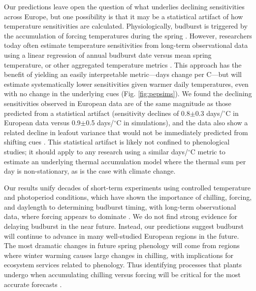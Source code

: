 \documentclass{article}
\newcommand{\R}[1]{\label{#1}\linelabel{#1}}
\begin{document}
\par Our predictions leave open the question of what underlies declining sensitivities across Europe, but one possibility is that it may be a statistical artifact of how temperature sensitivities are calculated. Physiologically, budburst is triggered by the accumulation of forcing temperatures during the spring \emph{\citep{chuine2016,hanninen1995}}. However, researchers today often estimate temperature sensitivities from long-term observational data using a linear regression of annual budburst date versus mean spring temperature, or other aggregated temperature metrics \emph{\citep[e.g.,][]{Wolkovich:2012n}}. This approach has the benefit of yielding an easily interpretable metric---days change per \degree C---but will estimate systematically lower sensitivities given warmer daily temperatures, even with no change in the underlying cues (Fig. \ref{fig:pepsims}). We found the declining sensitivities observed in European data are of the same magnitude as those predicted from a statistical artifact (sensitivity declines of 0.8$\pm$0.3 days/$^{\circ}$C in European data versus 0.9$\pm$0.5 days/$^{\circ}$C in simulations), and the data also show a related decline in leafout variance that would not be immediately predicted from shifting cues \emph{\citep[ \emph{Potential statistical artifacts in declines of temperature sensitivity in observational long-term data} ][]{gusewell2017}}. This statistical artifact is likely not confined to phenological studies; it should apply to any research using a similar days/$^{\circ}$C metric to estimate an underlying thermal accumulation model where the thermal sum per day is non-stationary, as is the case with climate change. 

 \par Our results unify decades of short-term experiments using controlled temperature and photoperiod conditions, which have shown the importance of chilling, forcing, and daylength to determining budburst timing, with long-term observational data, where forcing appears to dominate \R{addedroberts} \emph{\citep[e.g.,][]{roberts2015}}. We do not find strong evidence for delaying budburst in the near future. Instead, our predictions suggest budburst will continue to advance in many well-studied European regions in the future. The most dramatic changes in future spring phenology will come from regions where winter warming causes large changes in chilling, with implications for ecosystem services related to phenology. \R{R2_2}Thus identifying processes that plants undergo when accumulating chilling versus forcing will be critical for the most accurate forecasts \emph{\citep{chuine2016,Singh:2017}}. %
\end{document}
